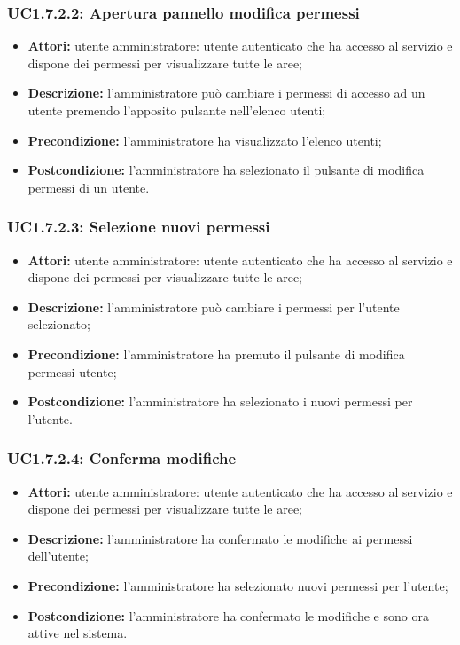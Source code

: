 \subsubsection{UC1.7.2.2: Apertura pannello modifica permessi}

\begin{itemize}
    \item \textbf{Attori:} utente amministratore: utente autenticato che ha accesso al servizio e dispone dei permessi per visualizzare tutte le aree;
    \item \textbf{Descrizione:} l'amministratore può cambiare i permessi di accesso ad un utente premendo l'apposito pulsante nell'elenco utenti;
    \item \textbf{Precondizione:} l'amministratore ha visualizzato l'elenco utenti;
    \item \textbf{Postcondizione:} l'amministratore ha selezionato il pulsante di modifica permessi di un utente.
\end{itemize}

\subsubsection{UC1.7.2.3: Selezione nuovi permessi}

\begin{itemize}
    \item \textbf{Attori:} utente amministratore: utente autenticato che ha accesso al servizio e dispone dei permessi per visualizzare tutte le aree;
    \item \textbf{Descrizione:} l'amministratore può cambiare i permessi per l'utente selezionato;
    \item \textbf{Precondizione:} l'amministratore ha premuto il pulsante di modifica permessi utente;
    \item \textbf{Postcondizione:} l'amministratore ha selezionato i nuovi permessi per l'utente.
\end{itemize}

\subsubsection{UC1.7.2.4: Conferma modifiche}

\begin{itemize}
    \item \textbf{Attori:} utente amministratore: utente autenticato che ha accesso al servizio e dispone dei permessi per visualizzare tutte le aree;
    \item \textbf{Descrizione:} l'amministratore ha confermato le modifiche ai permessi dell'utente;
    \item \textbf{Precondizione:} l'amministratore ha selezionato nuovi permessi per l'utente;
    \item \textbf{Postcondizione:} l'amministratore ha confermato le modifiche e sono ora attive nel sistema.
\end{itemize}

